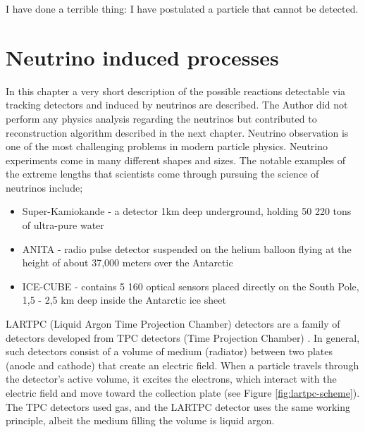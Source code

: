 \begin{savequote}[75mm]
I have done a terrible thing: I have postulated a particle that cannot be detected.
\end{savequote}

\chapter{Neutrino induced processes}
\label{sec:neu_dec}

In this chapter a very short description of the possible reactions detectable via tracking detectors and induced by neutrinos are described. The Author did not perform any physics analysis regarding the neutrinos but contributed to reconstruction algorithm described in the next chapter.
Neutrino observation is one of the most challenging problems in modern particle physics.
Neutrino experiments come in many different shapes and sizes.
The notable examples of the extreme lengths that scientists come through pursuing the science of neutrinos include;

\begin{itemize}
\item Super-Kamiokande\cite{FUKUDA2003418} - a detector 1km deep underground, holding 50 220 tons of ultra-pure water
\item ANITA\cite{0503304} - radio pulse detector suspended on the helium balloon flying at the height of about 37,000 meters over the Antarctic
\item ICE-CUBE\cite{Abbasi_2009} - contains 5 160 optical sensors placed directly on the South Pole, 1,5 - 2,5 km deep inside the Antarctic ice sheet
\end{itemize}

LARTPC (Liquid Argon Time Projection Chamber) \cite{Rubbia:117852} detectors are a family of detectors developed from TPC detectors (Time Projection Chamber) \cite{osti_6545918}.
In general, such detectors consist of a volume of medium (radiator) between two plates (anode and cathode) that create an electric field.
When a particle travels through the detector's active volume, it excites the electrons, which interact with the electric field and move toward the collection plate (see Figure \ref{fig:lartpc-scheme}).
The TPC detectors used gas, and the LARTPC detector uses the same working principle, albeit the medium filling the volume is liquid argon.

